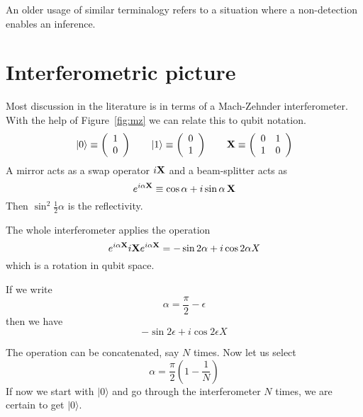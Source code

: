 \documentclass[12pt,aps,prb,preprint]{revtex4}
\def\ket#1{|#1\rangle}
\def\X{{\bf X}}
\begin{document}
An older usage of similar
terminalogy\cite{springerlink:10.1007/BF01327019,dicke:925} refers to
a situation where a non-detection enables an inference.

\section{Interferometric picture}

Most discussion in the literature is in terms of a Mach-Zehnder
interferometer.  With the help of Figure~{\ref{fig:mz}} we can relate
this to qubit notation.
\begin{equation}
\ket0 \equiv \left( \begin{array}{c} 1 \\ 0 \end{array} \right)  \qquad
\ket1 \equiv \left( \begin{array}{c} 0 \\ 1 \end{array} \right)  \qquad
\X \equiv \left( \begin{array}{cc} 0 & 1 \\ 1 & 0 \end{array} \right)
\end{equation}
A mirror acts as a swap operator $i\X$ and a beam-splitter acts as
\begin{equation}
e^{i\alpha\X} \equiv \cos\alpha + i\sin\alpha\,\X
\end{equation}
Then $\sin^2\frac12\alpha$ is the reflectivity.

The whole interferometer applies the operation
\begin{equation}
e^{i\alpha\X} i\X e^{i\alpha\X} = -\sin2\alpha + i\cos2\alpha X
\end{equation}
which is a rotation in qubit space.

If we write
\begin{equation}
\alpha = \frac\pi2 - \epsilon
\end{equation}
then we have
\begin{equation}
-\sin2\epsilon + i\cos2\epsilon X
\end{equation}


The operation can be concatenated, say $N$ times.  Now let us select
\begin{equation}
\alpha = \frac\pi2 \left(1-\frac1N\right)
\end{equation}
If now we start with $\ket0$ and go through the interferometer $N$
times, we are certain to get $\ket0$.
\end{document}
